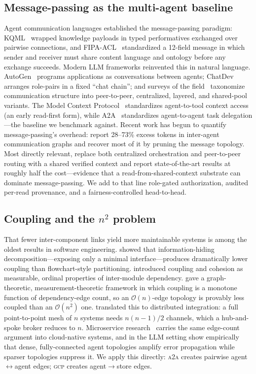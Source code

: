 \documentclass[10pt,twocolumn,letterpaper]{article}
\newcommand{\gcp}{\textsc{gcp}}
\newcommand{\ata}{\textsc{a2a}}
\newcommand{\bigoh}{\mathcal{O}}
\begin{document}
\subsection{Message-passing as the multi-agent baseline}
Agent communication languages established the message-passing paradigm: KQML~\citep{finin1994}
wrapped knowledge payloads in typed performatives exchanged over pairwise connections, and
FIPA-ACL~\citep{fipa2002} standardized a 12-field message in which sender and receiver must share
content language and ontology before any exchange succeeds. Modern LLM frameworks reinvented this
in natural language. AutoGen~\citep{wu2023autogen} programs applications as conversations between
agents; ChatDev~\citep{qian2024chatdev} arranges role-pairs in a fixed ``chat chain''; and surveys
of the field~\citep{guo2024survey} taxonomize communication structure into peer-to-peer,
centralized, layered, and shared-pool variants. The Model Context Protocol~\citep{mcp2024}
standardizes agent-to-tool context access (an early read-first form), while A2A~\citep{a2a2025}
standardizes agent-to-agent task delegation---the baseline we benchmark against. Recent work has
begun to quantify message-passing's overhead: \citet{zhang2024agentprune} report 28--73\% excess
tokens in inter-agent communication graphs and recover most of it by pruning the message topology.
Most directly relevant, \citet{mao2026delm} replace both centralized orchestration and peer-to-peer
routing with a shared verified context and report state-of-the-art results at roughly half the
cost---evidence that a read-from-shared-context substrate can dominate message-passing. We add to
that line role-gated authorization, audited per-read provenance, and a fairness-controlled head-to-head.

\subsection{Coupling and the $n^2$ problem}
That fewer inter-component links yield more maintainable systems is among the oldest results in
software engineering. \citet{parnas1972} showed that information-hiding decomposition---exposing
only a minimal interface---produces dramatically lower coupling than flowchart-style partitioning.
\citet{stevens1974} introduced coupling and cohesion as measurable, ordinal properties of
inter-module dependency. \citet{briand1999} gave a graph-theoretic, measurement-theoretic framework
in which coupling is a monotone function of dependency-edge count, so an $\bigoh(n)$-edge topology
is provably less coupled than an $\bigoh(n^2)$ one. \citet{hohpe2003} translated this to distributed
integration: a full point-to-point mesh of $n$ systems needs $n(n{-}1)/2$ channels, which a
hub-and-spoke broker reduces to $n$. Microservice research~\citep{panichella2021} carries the same
edge-count argument into cloud-native systems, and in the LLM setting \citet{shen2025topology} show
empirically that dense, fully-connected agent topologies amplify error propagation while sparser
topologies suppress it. We apply this directly: \ata{} creates pairwise
agent$\leftrightarrow$agent edges; \gcp{} creates agent$\rightarrow$store edges.
\end{document}
